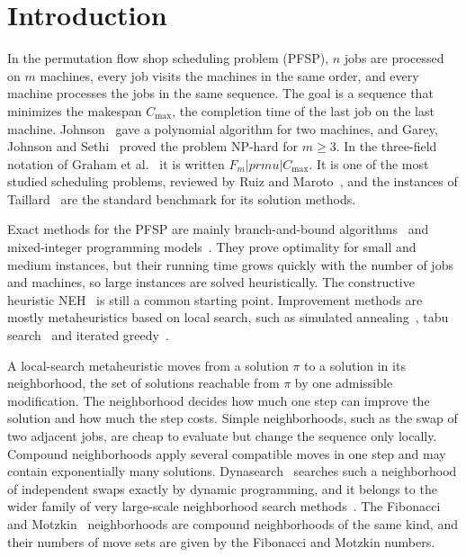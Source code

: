 \documentclass[10pt,twoside,twocolumn,a4paper]{article}
\title{\rev{Quantum and Classical Annealing for Very Large-Scale Neighborhood Search in the Permutation Flow Shop Problem}}
\author{Remigiusz Wojewódzki \email{remigiusz.wojewodzki@gmail.com} $^{1}$Wojciech Bożejko$^{2}$\email{wojciech.bozejko@pwr.edu.pl}}
\newif\ifrevmarks \revmarksfalse
\newenvironment{revblock}{\ifrevmarks\color{red}\fi}{}
\begin{document}
\maketitle


\section{Introduction}\label{sec:intro}

\begin{revblock}
In the permutation flow shop scheduling problem (PFSP), $n$ jobs are processed on $m$ machines, every job visits the machines in the same order, and every machine processes the jobs in the same sequence. The goal is a sequence that minimizes the makespan $C_{\max}$, the completion time of the last job on the last machine. Johnson~\cite{Johnson1954} gave a polynomial algorithm for two machines, and Garey, Johnson and Sethi~\cite{Garey1976} proved the problem NP-hard for $m\ge 3$. In the three-field notation of Graham et al.~\cite{Graham1979} it is written $F_m|prmu|C_{\max}$. It is one of the most studied scheduling problems, reviewed by Ruiz and Maroto~\cite{RuizMaroto2005}, and the instances of Taillard~\cite{ref_taillard} are the standard benchmark for its solution methods.

Exact methods for the PFSP are mainly branch-and-bound algorithms~\cite{Gmys2020} and mixed-integer programming models~\cite{Tseng2004}. They prove optimality for small and medium instances, but their running time grows quickly with the number of jobs and machines, so large instances are solved heuristically. The constructive heuristic NEH~\cite{NEH1983} is still a common starting point. Improvement methods are mostly metaheuristics based on local search, such as simulated annealing~\cite{OsmanPotts1989}, tabu search~\cite{taillard1990some,NowickiSmutnicki1996,GrabowskiWodecki2004} and iterated greedy~\cite{RuizStutzle2007}.

A local-search metaheuristic moves from a solution $\pi$ to a solution in its neighborhood, the set of solutions reachable from $\pi$ by one admissible modification. The neighborhood decides how much one step can improve the solution and how much the step costs. Simple neighborhoods, such as the swap of two adjacent jobs, are cheap to evaluate but change the sequence only locally. Compound neighborhoods apply several compatible moves in one step and may contain exponentially many solutions. Dynasearch~\cite{Congram2002} searches such a neighborhood of independent swaps exactly by dynamic programming, and it belongs to the wider family of very large-scale neighborhood search methods~\cite{Ahuja2002}. The Fibonacci~\cite{WojewodzkiBozejko2026} and Motzkin~\cite{Motzkin_PWR_EXIT,Motzkin_PWR} neighborhoods are compound neighborhoods of the same kind, and their numbers of move sets are given by the Fibonacci and Motzkin numbers.


\end{revblock}
\end{document}
